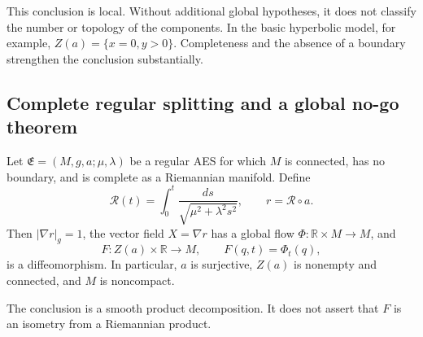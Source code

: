 This conclusion is local.  Without additional global hypotheses, it does not
classify the number or topology of the components.  In the basic hyperbolic
model, for example, \(Z(a)=\{x=0,y>0\}\).  Completeness and the absence of a
boundary strengthen the conclusion substantially.

\subsection{Complete regular splitting and a global no-go theorem}

\begin{theorem}
\label{thm:complete-regular-aes-splitting}
Let \(\mathfrak E=(M,g,a;\mu,\lambda)\) be a regular AES for which \(M\) is
connected, has no boundary, and is complete as a Riemannian manifold.  Define
\begin{equation}
  \mathcal R(t)
    =\int_0^t\frac{ds}{\sqrt{\mu^2+\lambda^2s^2}},
  \qquad
  r=\mathcal R\circ a.
  \label{eq:complete-aes-rectification}
\end{equation}
Then \(|\nabla r|_g=1\), the vector field \(X=\nabla r\) has a global flow
\(\Phi:\mathbb R\times M\to M\), and
\begin{equation}
  F:Z(a)\times\mathbb R\longrightarrow M,
  \qquad
  F(q,t)=\Phi_t(q),
  \label{eq:complete-aes-splitting-map}
\end{equation}
is a diffeomorphism.  In particular, \(a\) is surjective, \(Z(a)\) is nonempty
and connected, and \(M\) is noncompact.

The conclusion is a smooth product decomposition.  It does not assert that
\(F\) is an isometry from a Riemannian product.
\end{theorem}

